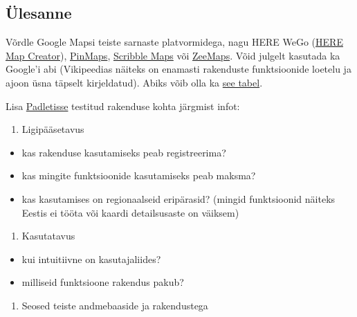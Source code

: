 \documentclass[
]{book}
\providecommand{\tightlist}{%
  \setlength{\itemsep}{0pt}\setlength{\parskip}{0pt}}
\begin{document}
\hypertarget{uxfclesanne-1}{%
\subsection{Ülesanne}\label{uxfclesanne-1}}

Võrdle Google Mapsi teiste sarnaste platvormidega, nagu HERE WeGo (\href{https://mapcreator.here.com}{HERE Map Creator}), \href{https://www.pinmaps.net/mymaps/}{PinMaps}, \href{https://www.scribblemaps.com/}{Scribble Maps} või \href{https://www.zeemaps.com/}{ZeeMaps}. Võid julgelt kasutada ka Google'i abi (Vikipeedias näiteks on enamasti rakenduste funktsioonide loetelu ja ajoon üsna täpselt kirjeldatud). Abiks võib olla ka \href{https://en.wikipedia.org/wiki/Comparison_of_web_map_services}{see tabel}.

Lisa \href{https://padlet.com/maarjaliisapilvik/n1tpoyussyalbsc6}{Padletisse} testitud rakenduse kohta järgmist infot:

\begin{enumerate}
\def\labelenumi{\arabic{enumi}.}
\tightlist
\item
  Ligipääsetavus\\
\end{enumerate}

\begin{itemize}
\tightlist
\item
  kas rakenduse kasutamiseks peab registreerima?
\item
  kas mingite funktsioonide kasutamiseks peab maksma?\\
\item
  kas kasutamises on regionaalseid eripärasid? (mingid funktsioonid näiteks Eestis ei tööta või kaardi detailsusaste on väiksem)\\
\end{itemize}

\begin{enumerate}
\def\labelenumi{\arabic{enumi}.}
\setcounter{enumi}{1}
\tightlist
\item
  Kasutatavus
\end{enumerate}

\begin{itemize}
\tightlist
\item
  kui intuitiivne on kasutajaliides?
\item
  milliseid funktsioone rakendus pakub?\\
\end{itemize}

\begin{enumerate}
\def\labelenumi{\arabic{enumi}.}
\setcounter{enumi}{2}
\tightlist
\item
  Seosed teiste andmebaaside ja rakendustega
\end{enumerate}
\end{document}
